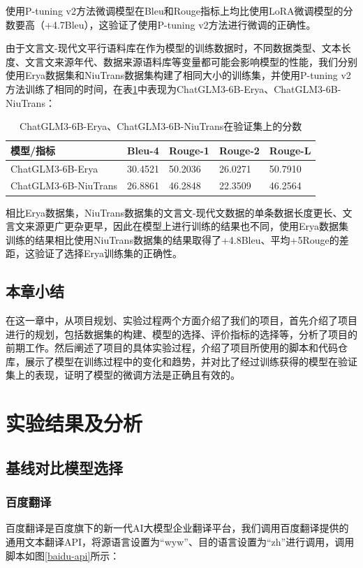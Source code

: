 \documentclass[
    decl-page,  %
    ,fontset = win, %
  ]{njuthesis}
\begin{document}
使用P-tuning v2方法微调模型在Bleu和Rouge指标上均比使用LoRA微调模型的分数要高（+4.7Bleu），这验证了使用P-tuning v2方法进行微调的正确性。

由于文言文-现代文平行语料库在作为模型的训练数据时，不同数据类型、文本长度、文言文来源年代、数据来源语料库等变量都可能会影响模型的性能，我们分别使用Erya数据集和NiuTrans数据集构建了相同大小的训练集，并使用P-tuning v2方法训练了相同的时间，在表\ref{E-N}中表现为ChatGLM3-6B-Erya、ChatGLM3-6B-NiuTrans：

\begin{table}[]
\renewcommand\arraystretch{1.5}
\caption{ChatGLM3-6B-Erya、ChatGLM3-6B-NiuTrans在验证集上的分数}
\label{E-N}
\begin{tabular}{|l|l|l|l|l|}
\hline
\textbf{模型/指标}       & \textbf{Bleu-4} & \textbf{Rouge-1} & \textbf{Rouge-2} & \textbf{Rouge-L} \\ \hline
ChatGLM3-6B-Erya     & 30.4521         & 50.2036          & 26.0271          & 50.7910           \\ \hline
ChatGLM3-6B-NiuTrans & 26.8861         & 46.2848          & 22.3509          & 46.2564          \\ \hline
\end{tabular}
\end{table}

相比Erya数据集，NiuTrans数据集的文言文-现代文数据的单条数据长度更长、文言文来源更广更杂更早，因此在模型上进行训练的结果也不同，使用Erya数据集训练的结果相比使用NiuTrans数据集的结果取得了+4.8Bleu、平均+5Rouge的差距，这验证了选择Erya训练集的正确性。

\section{本章小结}
在这一章中，从项目规划、实验过程两个方面介绍了我们的项目，首先介绍了项目进行的规划，包括数据集的构建、模型的选择、评价指标的选择等，分析了项目的前期工作。然后阐述了项目的具体实验过程，介绍了项目所使用的脚本和代码仓库，展示了模型在训练过程中的变化和趋势，并对比了经过训练获得的模型在验证集上的表现，证明了模型的微调方法是正确且有效的。

\chapter{实验结果及分析}
\section{基线对比模型选择}
\subsection{百度翻译}
百度翻译是百度旗下的新一代AI大模型企业翻译平台，我们调用百度翻译提供的通用文本翻译API，将源语言设置为“wyw”、目的语言设置为“zh”进行调用，调用脚本如图\ref{baidu-api}所示：
\end{document}
